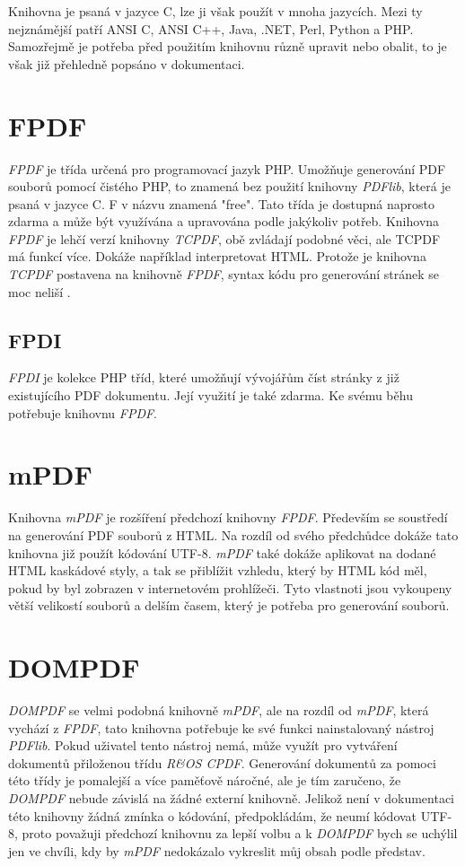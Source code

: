 \documentclass[czech,BP]{thesiskiv}
\begin{document}
Knihovna je psaná v jazyce C, lze ji však použít v mnoha jazycích. Mezi ty nejznámější patří ANSI C, ANSI C++, Java, .NET, Perl, Python a PHP. Samozřejmě je potřeba před použitím knihovnu různě upravit nebo obalit, to je však již přehledně popsáno v dokumentaci\cite{PDFlib_Manual}.

  
\section{FPDF}
\emph{FPDF} je třída určená pro programovací jazyk PHP. Umožňuje generování PDF souborů pomocí čistého PHP, to znamená bez použití knihovny \emph{PDFlib}, která je psaná v jazyce C. F v názvu znamená "free". Tato třída je dostupná naprosto zdarma a může být využívána a upravována podle jakýkoliv potřeb. Knihovna \emph{FPDF} je lehčí verzí knihovny \emph{TCPDF}, obě zvládají podobné věci, ale TCPDF má funkcí více. Dokáže například interpretovat HTML. Protože je knihovna \emph{TCPDF} postavena na knihovně \emph{FPDF}, syntax kódu pro generování stránek se moc neliší \cite{FPDF}\cite{FPDF_Book}. 
\subsection{FPDI}
\emph{FPDI} je kolekce PHP tříd, které umožňují vývojářům číst stránky z již existujícího PDF dokumentu. Její využití je také zdarma. Ke svému běhu potřebuje knihovnu \emph{FPDF}\cite{FPDI}.
\section{mPDF}
Knihovna \emph{mPDF} je rozšíření předchozí knihovny \emph{FPDF}. Především se soustředí na generování PDF souborů z HTML. Na rozdíl od svého předchůdce dokáže tato knihovna již použít kódování UTF-8. \emph{mPDF} také dokáže aplikovat na dodané HTML kaskádové styly, a tak se přiblížit vzhledu, který by HTML kód měl, pokud by byl zobrazen v internetovém prohlížeči. Tyto vlastnoti jsou vykoupeny větší velikostí souborů a delším časem, který je potřeba pro generování souborů. \cite{mPDF}
\section{DOMPDF}
\emph{DOMPDF} se velmi podobná knihovně \emph{mPDF}, ale na rozdíl od \emph{mPDF}, která vychází z \emph{FPDF}, tato knihovna potřebuje ke své funkci nainstalovaný nástroj \emph{PDFlib}. Pokud uživatel tento nástroj nemá, může využít pro vytváření dokumentů přiloženou třídu \emph{R\&OS CPDF}. Generování dokumentů za pomoci této třídy je pomalejší a více paměťově náročné, ale je tím zaručeno, že \emph{DOMPDF} nebude závislá na žádné externí knihovně. Jelikož není v dokumentaci této knihovny žádná zmínka o kódování, předpokládám, že neumí kódovat UTF-8, proto považuji předchozí knihovnu za lepší volbu a k \emph{DOMPDF} bych se uchýlil jen ve chvíli, kdy by \emph{mPDF} nedokázalo vykreslit můj obsah podle představ.  \cite{DOMPDF}
\end{document}
